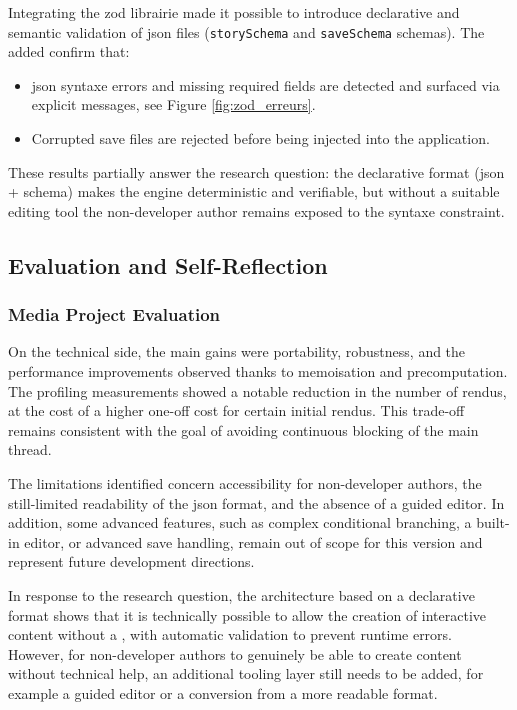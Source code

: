 Integrating the \gls{zod} \gls{librairie} made it possible to introduce declarative and semantic validation of \gls{json} files (\texttt{storySchema} and \texttt{saveSchema} \glspl{schema}). The  added confirm that:

\begin{itemize}
    \item \gls{json} \gls{syntaxe} errors and missing required fields are detected and surfaced via explicit messages, see Figure \ref{fig:zod_erreurs}.
    \item Corrupted save files are rejected before being injected into the application.
\end{itemize}

These results partially answer the research question: the declarative format (\gls{json} + \gls{schema}) makes the engine deterministic and verifiable, but without a suitable editing tool the non-developer author remains exposed to the \gls{syntaxe} constraint.



\subsection{Evaluation and Self-Reflection}

\subsubsection{Media Project Evaluation}

On the technical side, the main gains were portability, robustness, and the performance improvements observed thanks to \gls{memoisation} and precomputation. The profiling measurements showed a notable reduction in the number of \glspl{rendu}, at the cost of a higher one-off cost for certain initial \glspl{rendu}. This trade-off remains consistent with the goal of avoiding continuous blocking of the main thread.

The limitations identified concern accessibility for non-developer authors, the still-limited readability of the \gls{json} format, and the absence of a guided editor. In addition, some advanced features, such as complex conditional branching, a built-in editor, or advanced save handling, remain out of scope for this version and represent future development directions.

In response to the research question, the architecture based on a declarative format shows that it is technically possible to allow the creation of interactive content without a , with automatic validation to prevent runtime errors. However, for non-developer authors to genuinely be able to create content without technical help, an additional tooling layer still needs to be added, for example a guided editor or a conversion from a more readable format.



